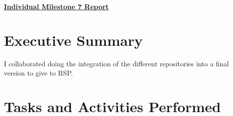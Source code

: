 \documentclass{article}
\begin{document}
\pagestyle{headings}

\begin{center}
{\LARGE\textbf{\underline{{Individual Milestone 7 Report}}}}
\end{center}

\section*{Executive Summary}

I collaborated doing the integration of the different repositories into a final version to give to RSP. 

\section*{Tasks and Activities Performed}
\end{document}
